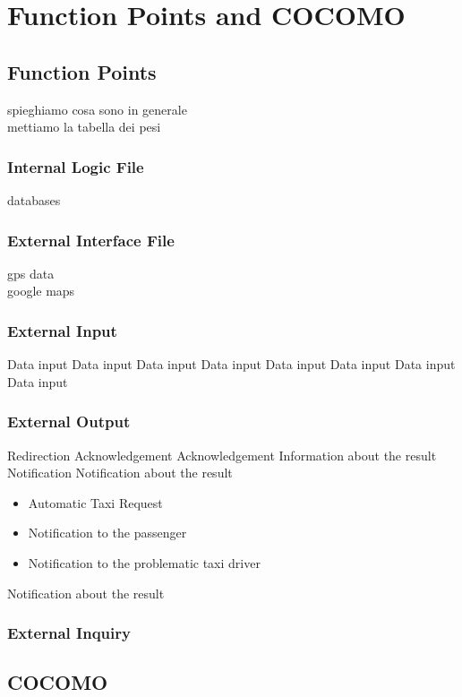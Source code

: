 \section{Function Points and COCOMO}
\subsection{Function Points}
spieghiamo cosa sono in generale\\
mettiamo la tabella dei pesi
\subsubsection{Internal Logic File}
databases
\subsubsection{External Interface File}
gps data\\
google maps
\subsubsection{External Input}
\begin{itemize}
	 Data input
	 Data input
	 Data input
	 Data input
	 Data input
	 Data input
	 Data input
	 Data input
\end{itemize}
\subsubsection{External Output}
\begin{itemize}
	 Redirection
	 Acknowledgement
	 Acknowledgement
	 Information about the result
	 Notification
	 Notification about the result
	\begin{itemize}
		\item Automatic Taxi Request
		\item Notification to the passenger
		\item Notification to the problematic taxi driver
	\end{itemize}
	 Notification about the result
\end{itemize}
\subsubsection{External Inquiry}
\begin{itemize}
\end{itemize}
\subsection{COCOMO}